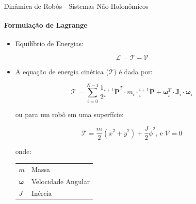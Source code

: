 \documentclass[aspectratio=169]{beamer}
\begin{document}
\begin{frame}{Dinâmica de Robôs - Sistemas Não-Holonômicos}
    \framesubtitle{Formulação de Lagrange}

    \begin{itemize}

        \item Equilíbrio de Energias:

              \begin{equation}
                  \mathcal{L}= \mathcal{T} - \mathcal{V}
              \end{equation}

        \item A equação de energia cinética ($\mathcal{T}$) é dada por:

              \begin{equation}
                  \mathcal{T} = \sum\limits_{i=0}^{N-1} \frac{1}{2} {}_{i}^{i+1}\dot{\mathbf{P}}^T\cdot m_{i}\cdot {}_{i}^{i+1}\dot{\mathbf{P}}+ \mathbf{\omega}_i^T\cdot \mathbf{J}_i \cdot \mathbf{\omega}_i
              \end{equation}

              \begin{block}{ou para um robô em uma superfície:}

                  \begin{equation*}
                      \boxed{
                          \mathcal{T} = \frac{m}{2}\left(\dot{x}^2+\dot{y}^2 \right)+ \frac{J}{2}\dot{\phi}^2}
                      \text{, e  }
                      \boxed{\mathcal{V} = 0}
                  \end{equation*}
                  \scriptsize{
                      onde:
                      \begin{tabular}{l|l}
                          $m$               & Massa              \\
                          $\mathbf{\omega}$ & Velocidade Angular \\
                          $J$               & Inércia            \\
                      \end{tabular}}
              \end{block}
    \end{itemize}
\end{frame}
\end{document}
